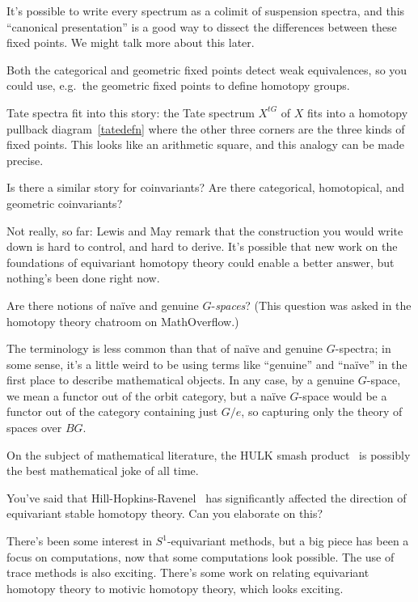 It's possible to write every spectrum as a colimit of suspension spectra, and this ``canonical presentation'' is a
good way to dissect the differences between these fixed points. We might talk more about this later.

Both the categorical and geometric fixed points detect weak equivalences, so you could use, e.g.\ the geometric
fixed points to define homotopy groups.

Tate spectra fit into this story: the Tate spectrum $X^{tG}$ of $X$ fits into a homotopy pullback
diagram~\eqref{tatedefn} where the other three corners are the three kinds of fixed points. This looks like an
arithmetic square, and this analogy can be made precise.
\begin{ques}
Is there a similar story for coinvariants? Are there categorical, homotopical, and geometric coinvariants?
\end{ques}
Not really, so far: Lewis and May remark that the construction you would write down is hard to control, and hard to
derive. It's possible that new work on the foundations of equivariant homotopy theory could enable a better answer,
but nothing's been done right now.
\begin{ques}
Are there notions of naïve and genuine $G$-\emph{spaces}? (This question was asked in the homotopy theory chatroom
on MathOverflow.)
\end{ques}
The terminology is less common than that of naïve and genuine $G$-spectra; in some sense, it's a little weird to
be using terms like ``genuine'' and ``naïve'' in the first place to describe mathematical objects. In any case, by
a genuine $G$-space, we mean a functor out of the orbit category, but a naïve $G$-space would be a functor out of
the category containing just $G/e$, so capturing only the theory of spaces over $BG$.

On the subject of mathematical literature, the HULK smash product~\cite{HulkSmash} is possibly the best
mathematical joke of all time.
\begin{ques}
You've said that Hill-Hopkins-Ravenel~\cite{HHR} has significantly affected the direction of equivariant stable
homotopy theory. Can you elaborate on this?
\end{ques}
There's been some interest in $S^1$-equivariant methods, but a big piece has been a focus on computations, now that
some computations look possible. The use of trace methods is also exciting. There's some work on relating
equivariant homotopy theory to motivic homotopy theory, which looks exciting.

